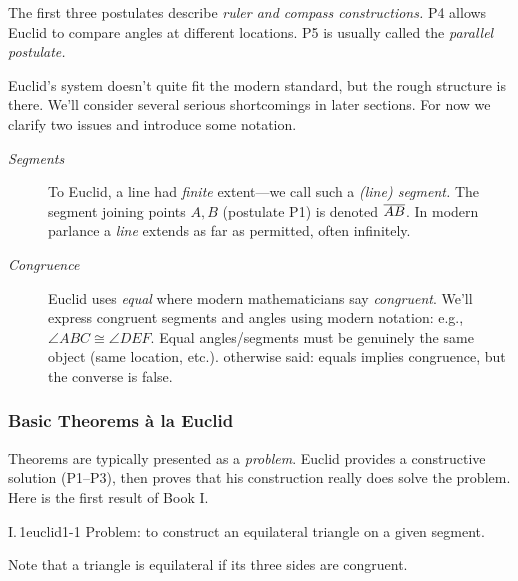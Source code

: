 The first three postulates describe \emph{ruler and compass constructions.} P4 allows Euclid to compare angles at different locations. P5 is usually called the \emph{parallel postulate.}
\medbreak

Euclid's system doesn't quite fit the modern standard, but the rough structure is there. We'll consider several serious shortcomings in later sections. For now we clarify two issues and introduce some notation.
\begin{description}
	\item[\normalfont\emph{Segments}] To Euclid, a line had \emph{finite} extent---we call such a \emph{(line) segment.} The segment joining points $A,B$ (postulate P1) is denoted $\overline{AB}$. In modern parlance a \emph{line} extends as far as permitted, often infinitely.
	\item[\normalfont\emph{Congruence}] Euclid uses \emph{equal} where modern mathematicians say \emph{congruent}. We'll express congruent segments and angles using modern notation: e.g., $\angle ABC\cong\angle DEF$. Equal angles/segments must be genuinely the same object (same location, etc.). otherwise said: equals implies congruence, but the converse is false.
\end{description}



\subsubsection*{Basic Theorems à la Euclid}

Theorems are typically presented as a \emph{problem}. Euclid provides a constructive solution (P1--P3), then proves that his construction really does solve the problem. Here is the first result of Book I.

\begin{thm}{I.\,1}{euclid1-1}
	Problem: to construct an equilateral triangle on a given segment.
\end{thm}

Note that a triangle is equilateral if its three sides are congruent.


